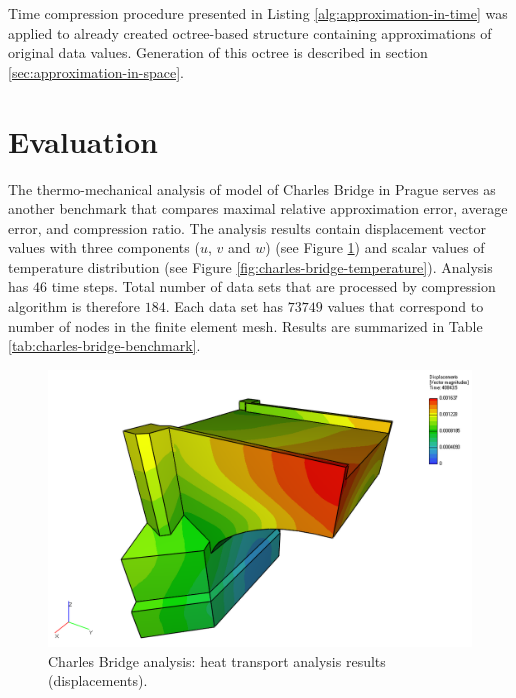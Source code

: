 Time compression procedure presented in Listing \ref{alg:approximation-in-time} was applied to already created octree-based structure containing approximations of original data values. Generation of this octree is described in section \ref{sec:approximation-in-space}.


\section{Evaluation}

The thermo-mechanical analysis of model of Charles Bridge in Prague serves as another benchmark that compares maximal relative approximation error, average error, and compression ratio. The analysis results contain displacement vector values with three components ($u$, $v$ and $w$) (see Figure \ref{fig:charles-bridge-model}) and scalar values of temperature distribution (see Figure \ref{fig:charles-bridge-temperature}). Analysis has $46$ time steps. Total number of data sets that are processed by compression algorithm is therefore $184$. Each data set has $73749$ values that correspond to number of nodes in the finite element mesh. Results are summarized in Table \ref{tab:charles-bridge-benchmark}.

\begin{figure}[H]
  \centering
  \includegraphics[width=\textwidth]{figures/chapter-approximation/charles-bridge-model}
  \decoRule
  \caption[Heat transport analysis results (displacements).]{Charles Bridge analysis: heat transport analysis results (displacements).}
  \label{fig:charles-bridge-model}
\end{figure}

